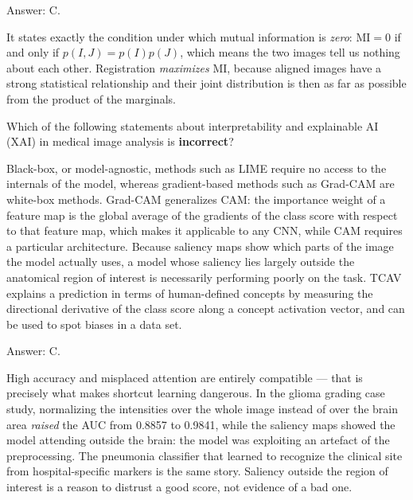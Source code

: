 \documentclass[11pt]{exam}
\begin{document}
\begin{questions}
\begin{solution}
  Answer: C.

  It states exactly the condition under which mutual information is \emph{zero}:
  $\mathrm{MI} = 0$ if and only if $p(I,J) = p(I)p(J)$, which means the two images tell us nothing
  about each other. Registration \emph{maximizes} MI, because aligned images have a strong
  statistical relationship and their joint distribution is then as far as possible from the
  product of the marginals.
\end{solution}

\question
Which of the following statements about interpretability and explainable AI (XAI) in medical image
analysis is \textbf{incorrect}?

\begin{choices}
  \choice Black-box, or model-agnostic, methods such as LIME require no access to the internals of
  the model, whereas gradient-based methods such as Grad-CAM are white-box methods.
  \choice Grad-CAM generalizes CAM: the importance weight of a feature map is the global average of
  the gradients of the class score with respect to that feature map, which makes it applicable to
  any CNN, while CAM requires a particular architecture.
  \choice Because saliency maps show which parts of the image the model actually uses, a model whose
  saliency lies largely outside the anatomical region of interest is necessarily performing poorly
  on the task.
  \choice TCAV explains a prediction in terms of human-defined concepts by measuring the directional
  derivative of the class score along a concept activation vector, and can be used to spot biases in
  a data set.
\end{choices}

\begin{solution}
  Answer: C.

  High accuracy and misplaced attention are entirely compatible --- that is precisely what makes
  shortcut learning dangerous. In the glioma grading case study, normalizing the intensities over
  the whole image instead of over the brain area \emph{raised} the AUC from 0.8857 to 0.9841, while
  the saliency maps showed the model attending outside the brain: the model was exploiting an
  artefact of the preprocessing. The pneumonia classifier that learned to recognize the clinical
  site from hospital-specific markers is the same story. Saliency outside the region of interest is
  a reason to distrust a good score, not evidence of a bad one.
\end{solution}


\end{questions}
\end{document}
